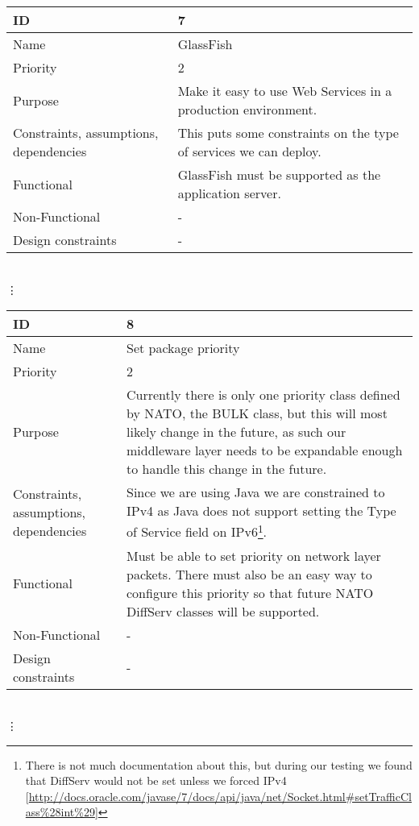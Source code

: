 \begin{tabular}{| p{4cm} | p{8cm} |}
    \hline
    ID & 7 \\
    \hline
    Name & GlassFish \\
    \hline
    Priority & 2 \\
    \hline
    Purpose & Make it easy to use Web Services in a production environment. \\
    \hline 
    Constraints, assumptions, dependencies & This puts some constraints on the type of services we can deploy. \\
    \hline  
    Functional & GlassFish must be supported as the application server.  \\
    \hline
    Non-Functional & - \\ 
    \hline
    Design constraints & - \\
    \hline
\end{tabular}
\\  \vdots  \\

\begin{tabular}{| p{4cm} | p{8cm} |}
    \hline
    ID & 8 \\
    \hline
    Name & Set package priority \\
    \hline
    Priority & 2 \\
    \hline
    Purpose & Currently there is only one priority class defined by NATO, the BULK class, but this will most likely change in the future, as such our middleware layer needs to be expandable enough to handle this change in the future. \\
    \hline 
    Constraints, assumptions, dependencies & Since we are using Java we are constrained to IPv4 as Java does not support setting the Type of Service field on IPv6\footnote{There is not much documentation about this, but during our testing we found that DiffServ would not be set unless we forced IPv4 [\url{http://docs.oracle.com/javase/7/docs/api/java/net/Socket.html#setTrafficClass\%28int\%29}]}.\\
    \hline  
    Functional & Must be able to set priority on network layer packets. There must also be an easy way to configure this priority so that future NATO DiffServ classes will be supported. \\
    \hline
    Non-Functional & -\\ 
    \hline
    Design constraints & - \\
    \hline
\end{tabular}
\\  \vdots  \\

